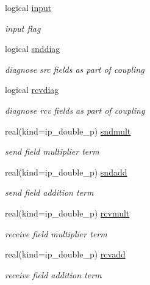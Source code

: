 \begin{DoxyCompactItemize}
logical \hyperlink{structmod__oasis__coupler_1_1prism__coupler__type_a1cda09cced2782af8cdccae35a00107d}{input}
\begin{DoxyCompactList}\small\item\em input flag \end{DoxyCompactList}\item 
logical \hyperlink{structmod__oasis__coupler_1_1prism__coupler__type_ae0ad5bd2dfbc17cbdceeda23c92dbebe}{snddiag}
\begin{DoxyCompactList}\small\item\em diagnose src fields as part of coupling \end{DoxyCompactList}\item 
logical \hyperlink{structmod__oasis__coupler_1_1prism__coupler__type_a05d7a7317dd4b063ced94cebd4dfedc7}{rcvdiag}
\begin{DoxyCompactList}\small\item\em diagnose rcv fields as part of coupling \end{DoxyCompactList}\item 
real(kind=ip\+\_\+double\+\_\+p) \hyperlink{structmod__oasis__coupler_1_1prism__coupler__type_ad17bb1c791d2ef48cf7b4abf955bf43b}{sndmult}
\begin{DoxyCompactList}\small\item\em send field multiplier term \end{DoxyCompactList}\item 
real(kind=ip\+\_\+double\+\_\+p) \hyperlink{structmod__oasis__coupler_1_1prism__coupler__type_ad0176e1d6bdcb0f50fc5889921aec8dc}{sndadd}
\begin{DoxyCompactList}\small\item\em send field addition term \end{DoxyCompactList}\item 
real(kind=ip\+\_\+double\+\_\+p) \hyperlink{structmod__oasis__coupler_1_1prism__coupler__type_a9733b71cc0ade029f7f19be6ad114596}{rcvmult}
\begin{DoxyCompactList}\small\item\em receive field multiplier term \end{DoxyCompactList}\item 
real(kind=ip\+\_\+double\+\_\+p) \hyperlink{structmod__oasis__coupler_1_1prism__coupler__type_adee95ace457db5ccaacc0195f3327277}{rcvadd}
\begin{DoxyCompactList}\small\item\em receive field addition term \end{DoxyCompactList}\item 

\end{DoxyCompactItemize}
